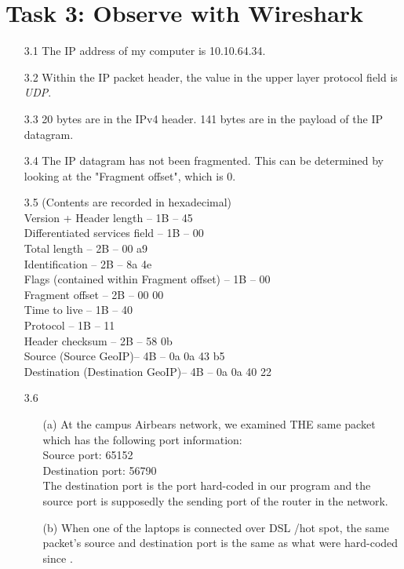 \documentclass[11pt]{article}
\begin{document}
   \section*{Task 3: Observe with Wireshark}
   \begin{itemize}
   \item[3.1]
   The IP address of my computer is 10.10.64.34. 
     
   \item[3.2]
   Within the IP packet header, the value in the upper layer protocol field is \emph{UDP}.
   
   \item[3.3]
   20 bytes are in the IPv4 header. 141 bytes are in the payload of the IP datagram.
   
   \item[3.4]
   The IP datagram has not been fragmented. This can be determined by looking at the "Fragment offset", which is 0.
   
   \item[3.5] (Contents are recorded in hexadecimal)\\
   Version +  Header length -- 1B -- 45\\
   Differentiated services field -- 1B -- 00\\
   Total length -- 2B -- 00 a9\\
   Identification -- 2B -- 8a 4e\\
   Flags (contained within Fragment offset) -- 1B -- 00\\
   Fragment offset -- 2B -- 00 00\\
   Time to live -- 1B -- 40\\
   Protocol -- 1B -- 11\\
   Header checksum -- 2B -- 58 0b \\
   Source (Source GeoIP)-- 4B -- 0a 0a 43 b5\\
   Destination (Destination GeoIP)-- 4B -- 0a 0a 40 22
   
  
   
   \item[3.6]
   \begin{itemize}
   \item[(a)]
   At the campus Airbears network, we examined THE same packet which has the following port information:\\
   Source port: 65152\\
   Destination port: 56790\\
   The destination port is the port hard-coded in our program and the source port is supposedly the sending port of the router in the network.
   
   \item[(b)]
   When one of the laptops is connected over DSL /hot spot, the same packet's source and destination port is the same as what were hard-coded since .
   
   \end{itemize}
    
   \end{itemize}  
    
\end{document}
